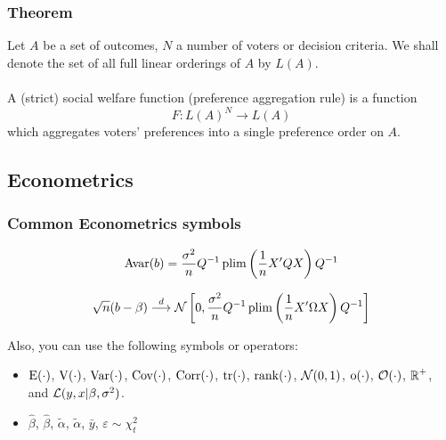 \documentclass[aspectratio=169]{beamer}
\begin{document}

\begin{frame}
\frametitle{Theorem}
\begin{theorem}
Let $A$ be a set of outcomes, $N$ a number of voters or decision criteria. We shall denote the set of all full linear orderings of $A$ by $L(A)$.\\~\\

A (strict) social welfare function (preference aggregation rule) is a function
\begin{equation}
    F: L(A)^N \longrightarrow L(A)
\end{equation}
which aggregates voters' preferences into a single preference order on $A$.
\end{theorem}
\end{frame}


\subsection{Econometrics}


\begin{frame}
\frametitle{Common Econometrics symbols}

\begin{equation}
    \operatorname{\mathrm{Avar}} (b) = \frac{\sigma^2}{n} Q^{-1} \operatorname{plim} \left( \frac{1}{n}X'QX \right)Q^{-1}
\end{equation}

\begin{equation}
    \sqrt{n}(b-\beta) \stackrel{d}{\longrightarrow} \operatorname{\mathcal{N}} \left[0,\frac{\sigma^2}{n} Q^{-1} \operatorname{plim} \left( \frac{1}{n}X'\Omega X\right)Q^{-1}\right]
\end{equation}

Also, you can use the following symbols or operators:
\begin{itemize}
    \item $\operatorname{\mathrm{E}}(\cdot)$, $\operatorname{\mathrm{V}}(\cdot)$, $\operatorname{\mathrm{Var}}(\cdot)$, $\operatorname{\mathrm{Cov}}(\cdot)$, $\operatorname{\mathrm{Corr}}(\cdot)$, $\operatorname{\mathrm{tr}}(\cdot)$, $\operatorname{rank}(\cdot)$, $\operatorname{\mathcal{N}}(0,1)$, $\operatorname{\mathrm{o}}(\cdot)$, $\operatorname{\mathcal{O}}(\cdot)$, $\operatorname{\mathbb{R}}^+$, and $\operatorname{\mathcal{L}}(y,x|\beta,\sigma^2)$.
    \item $\hat \beta$, $\widehat \beta$, $\tilde \alpha$, $\widetilde \alpha$, $\bar y$, $\varepsilon \sim \chi^2_t$
\end{itemize}

\end{frame}
\end{document}
